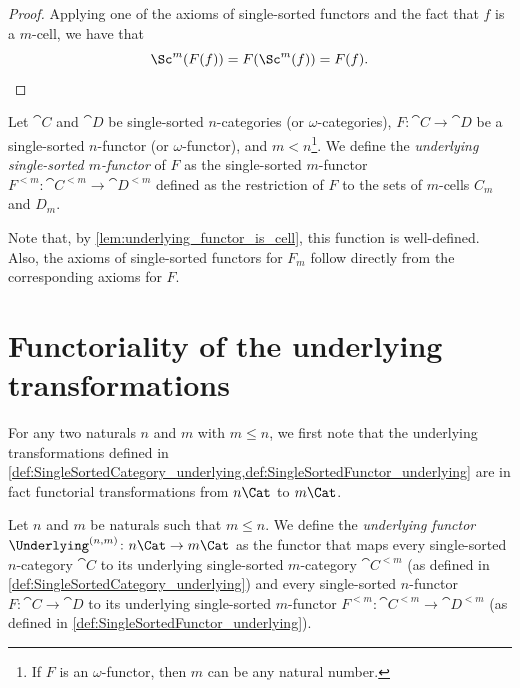 \begin{proof}
  \leanok
  Applying one of the axioms of single-sorted functors and the fact that $f$ is a $m$-cell, we
  have that
  \[
    \Sc^m (F(f)) = F(\Sc^m (f)) = F(f).
  \]
\end{proof}

\begin{definition}
  \label{def:SingleSortedFunctor_underlying}
  \leanok
  Let $\cat{C}$ and $\cat{D}$ be single-sorted $n$-categories (or $\omega$-categories), $F \colon
  \cat{C} \to \cat{D}$ be a single-sorted $n$-functor (or $\omega$-functor), and $m < n$\footnote{If
  $F$ is an $\omega$-functor, then $m$ can be any natural number.}. We define the
  \emph{underlying single-sorted $m$-functor} of $F$ as the single-sorted $m$-functor $F^{<m} \colon
  \cat{C}^{<m} \to \cat{D}^{<m}$ defined as the restriction of $F$ to the sets of $m$-cells $C_m$
  and $D_m$.

  Note that, by \cref{lem:underlying_functor_is_cell}, this function is well-defined. Also, the
  axioms of single-sorted functors for $F_m$ follow directly from the corresponding axioms for $F$.
\end{definition}

\section{Functoriality of the underlying transformations}

For any two naturals $n$ and $m$ with $m \leq n$, we first note that the underlying transformations
defined in \cref{def:SingleSortedCategory_underlying,def:SingleSortedFunctor_underlying} are in fact
functorial transformations from $n\Cat$ to $m\Cat$.

\begin{definition}
  \label{def:UnderlyingFunctor}
  \leanok
  Let $n$ and $m$ be naturals such that $m \le n$. We define the \emph{underlying functor}
  $\Underlying^{(n, m)} \colon n\Cat \to m\Cat$ as the functor that maps every single-sorted
  $n$-category $\cat{C}$ to its underlying single-sorted $m$-category $\cat{C}^{<m}$ (as defined in
  \cref{def:SingleSortedCategory_underlying}) and every single-sorted $n$-functor $F \colon \cat{C}
  \to \cat{D}$ to its underlying single-sorted $m$-functor $F^{<m} \colon \cat{C}^{<m} \to
  \cat{D}^{<m}$ (as defined in \cref{def:SingleSortedFunctor_underlying}).
\end{definition}
